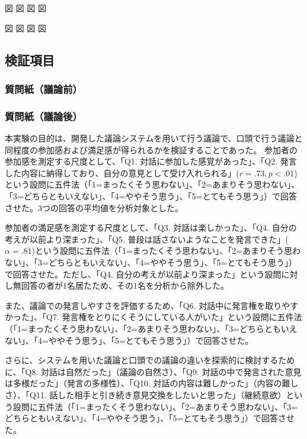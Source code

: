 \documentclass[11pt, a4paper]{jreport} %
\begin{document}
図
図
図
図


図
図
図
図



\subsection{検証項目}


\subsubsection*{質問紙（議論前）}

\subsubsection*{質問紙（議論後）}

本実験の目的は、開発した議論システムを用いて行う議論で、口頭で行う議論と同程度の参加感および満足感が得られるかを検証することであった。
参加者の参加感を測定する尺度として、「Q1. 対話に参加した感覚があった」、「Q2. 発言した内容に納得しており、自分の意見として受け入れられる」($r=.73, p<.01$)という設問に五件法（「1=まったくそう思わない」、「2=あまりそう思わない」、「3=どちらともいえない」、「4=ややそう思う」、「5=とてもそう思う」）で回答させた。3つの回答の平均値を分析対象とした。

参加者の満足感を測定する尺度として、「Q3. 対話は楽しかった」、「Q4. 自分の考えが以前より深まった」、「Q5. 普段は話さないようなことを発言できた」($\alpha =.81$)という設問に五件法（「1=まったくそう思わない」、「2=あまりそう思わない」、「3=どちらともいえない」、「4=ややそう思う」、「5=とてもそう思う」）で回答させた。ただし、「Q4. 自分の考えが以前より深まった」という設問に対し無回答の者が1名居たため、その1名を分析から除外した。


また、議論での発言しやすさを評価するため、「Q6. 対話中に発言権を取りやすかった」、「Q7. 発言権をとりにくそうにしている人がいた」という設問に五件法（「1=まったくそう思わない」、「2=あまりそう思わない」、「3=どちらともいえない」、「4=ややそう思う」、「5=とてもそう思う」）で回答させた。



さらに、システムを用いた議論と口頭での議論の違いを探索的に検討するために、「Q8. 対話は自然だった」（議論の自然さ）、「Q9. 対話の中で発言された意見は多様だった」（発言の多様性）、「Q10. 対話の内容は難しかった」（内容の難しさ）、「Q11. 話した相手と引き続き意見交換をしたいと思った」（継続意欲）という設問に五件法（「1=まったくそう思わない」、「2=あまりそう思わない」、「3=どちらともいえない」、「4=ややそう思う」、「5=とてもそう思う」）で回答させた。
\end{document}
